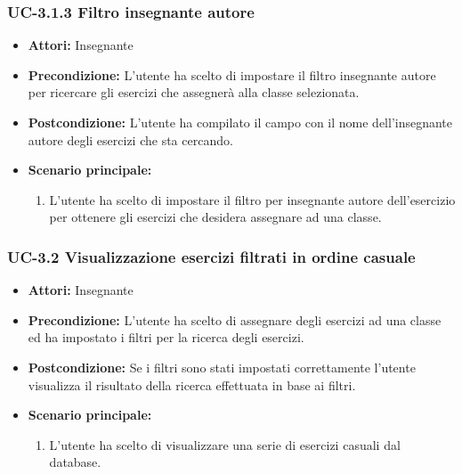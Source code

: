 \subsubsection{UC-3.1.3 Filtro insegnante autore}
\begin{itemize}
		\item \textbf{Attori: } Insegnante
		\item \textbf{Precondizione: }L'utente ha scelto di impostare il filtro insegnante autore per ricercare gli esercizi che assegnerà alla classe selezionata.
		\item \textbf{Postcondizione: }L'utente ha compilato il campo con il nome dell'insegnante autore degli esercizi che sta cercando.
		\item \textbf{Scenario principale: }
		\begin{enumerate}
			\item L'utente ha scelto di impostare il filtro per insegnante autore dell'esercizio per ottenere gli esercizi che desidera assegnare ad una classe.
		\end{enumerate}
\end{itemize}
\subsubsection{UC-3.2 Visualizzazione esercizi filtrati in ordine casuale}
\begin{itemize}
		\item \textbf{Attori: }Insegnante
		\item \textbf{Precondizione: }L'utente ha scelto di assegnare degli esercizi ad una classe ed ha impostato i filtri per la ricerca degli esercizi.
		\item \textbf{Postcondizione: }Se i filtri sono stati impostati correttamente l'utente visualizza il risultato della ricerca effettuata in base ai filtri.
		\item \textbf{Scenario principale: }
		\begin{enumerate}
			\item L'utente ha scelto di visualizzare una serie di esercizi casuali dal database.
		\end{enumerate}
\end{itemize}
